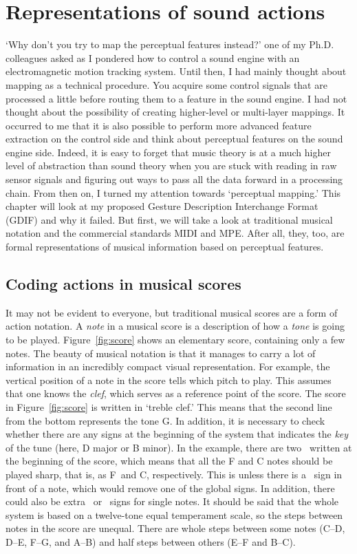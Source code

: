 \chapter{Representations of sound actions}

`Why don't you try to map the perceptual features instead?' one of my Ph.D. colleagues asked as I pondered how to control a sound engine with an electromagnetic motion tracking system. Until then, I had mainly thought about mapping as a technical procedure. You acquire some control signals that are processed a little before routing them to a feature in the sound engine. I had not thought about the possibility of creating higher-level or multi-layer mappings. It occurred to me that it is also possible to perform more advanced feature extraction on the control side and think about perceptual features on the sound engine side. Indeed, it is easy to forget that music theory is at a much higher level of abstraction than sound theory when you are stuck with reading in raw sensor signals and figuring out ways to pass all the data forward in a processing chain. From then on, I turned my attention towards `perceptual mapping.' This chapter will look at my proposed Gesture Description Interchange Format (GDIF) and why it failed. But first, we will take a look at traditional musical notation and the commercial standards MIDI and MPE. After all, they, too, are formal representations of musical information based on perceptual features.


\section{Coding actions in musical scores}

It may not be evident to everyone, but traditional musical scores are a form of action notation. A \emph{note} in a musical score is a description of how a \emph{tone} is going to be played. Figure~\ref{fig:score} shows an elementary score, containing only a few notes. The beauty of musical notation is that it manages to carry a lot of information in an incredibly compact visual representation. For example, the vertical position of a note in the score tells which pitch to play. This assumes that one knows the \emph{clef}, which serves as a reference point of the score. The score in Figure~\ref{fig:score} is written in `treble clef.' This means that the second line from the bottom represents the tone G. In addition, it is necessary to check whether there are any signs at the beginning of the system that indicates the  \emph{key} of the tune (here, D major or B minor). In the example, there are two \musSharp\ written at the beginning of the score, which means that all the F and C notes should be played sharp, that is, as F\musSharp\ and C\musSharp, respectively. This is unless there is a \musNatural\ sign in front of a note, which would remove one of the global signs. In addition, there could also be extra \musSharp\ or \musFlat\ signs for single notes. It should be said that the whole system is based on a twelve-tone equal temperament scale, so the steps between notes in the score are unequal. There are whole steps between some notes (C--D, D--E, F--G, and A--B) and half steps between others (E--F and B--C).


